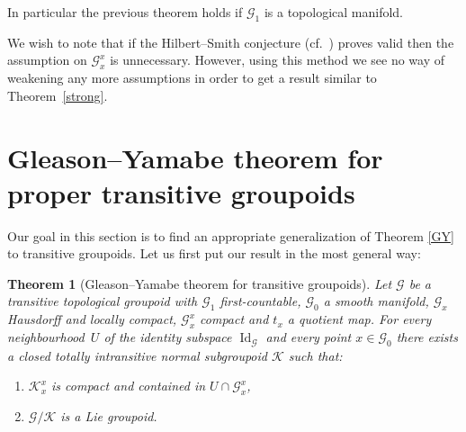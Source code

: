 \documentclass[pdftex]{sigma}
\newtheorem{tw}{Theorem}[section]
\begin{document}
\begin{rem} In particular the previous theorem holds if $\mathcal{G}_1$ is a topological manifold.
\end{rem}
\begin{rem} We wish to note that if the Hilbert--Smith conjecture (cf.~\cite{TT}) proves valid then the assumption on $\mathcal{G}_x^x$ is unnecessary. However, using this method we see no way of weakening any more assumptions in order to get a result similar to Theorem~\ref{strong}.
\end{rem}

\section{Gleason--Yamabe theorem for proper transitive groupoids}
 Our goal in this section is to find an appropriate generalization of Theorem \ref{GY} to transitive groupoids. Let us first put our result in the most general way:

\begin{tw}[Gleason--Yamabe theorem for transitive groupoids]\label{GYS} Let $\mathcal{G}$ be a transitive topological groupoid with $\mathcal{G}_1$ first-countable, $\mathcal{G}_0$ a smooth manifold, $\mathcal{G}_x$ Hausdorff and locally compact, $\mathcal{G}^x_x$ compact and $t_x$ a quotient map. For every neighbourhood~$U$ of the identity subspace $\operatorname{Id}_{\mathcal{G}}$ and every point $x\in\mathcal{G}_0$ there exists a closed totally intransitive normal subgroupoid $\mathcal{K}$ such that:
\begin{enumerate}\itemsep=0pt
\item[$1)$] $\mathcal{K}^x_x$ is compact and contained in $U\cap\mathcal{G}^x_x$,
\item[$2)$] $\mathcal{G}\slash\mathcal{K}$ is a Lie groupoid.
\end{enumerate}
\end{tw}
\end{document}
